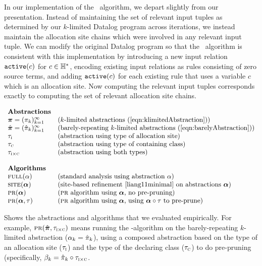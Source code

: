 In our implementation of the \PR\ algorithm, we depart slightly from our
presentation.  Instead of maintaining the set of relevant input tuples as
determined by our $k$-limited Datalog program across iterations, we instead
maintain the allocation site chains which were involved in any relevant input
tuple.  We can modify the original Datalog program so that the \PR\ algorithm
is consistent with this implementation by introducing a new input relation
$\text{\tt active}(c)$ for $c \in {\mathbb H}^*$, encoding existing input relations as rules
consisting of zero source terms, and adding $\text{\tt active}(c)$ for each existing
rule that uses a variable $c$ which is an allocation site.  Now computing the
relevant input tuples corresponds exactly to computing the set of relevant
allocation site chains.

\begin{table}
\[
\begin{array}{ll}
\text{\bf Abstractions} \\
\Klimabs = (\klimabs_k)_{k=1}^\infty   & \defn{$k$-limited abstractions \refeqn{klimitedAbstraction}} \\
\Klimdabs = (\klimdabs_k)_{k=1}^\infty & \defn{barely-repeating $k$-limited abstractions \refeqn{barelyAbstraction}} \\
\hclassIs                              & \defn{abstraction using type of allocation site} \\
\hclassHas                             & \defn{abstraction using type of containing class} \\
\hclassIsHas                           & \defn{abstraction using both types} \\
\\
\text{\bf Algorithms} \\
\Full(\alpha)         & \defn{standard analysis using abstraction $\alpha$} \\
\Site(\balpha)        & \defn{site-based refinement \cite{liang11minimal} on abstractions $\balpha$} \\
\PR(\balpha)          & \defn{\PR\ algorithm using $\balpha$, no pre-pruning} \\
\PR(\balpha,\hclass)  & \defn{\PR\ algorithm using $\balpha$, using $\balpha\circ\hclass$ to pre-prune} \\
\end{array}
\]
\caption{\label{tab:algorithms} Shows the abstractions and algorithms that we evaluated empirically.
For example,
$\text{\sc pr}(\hat{\mbox{\boldmath$\pi$}},\tau_{\text{\sc i} \times \text{\sc c}})$
means running the \PR-algorithm on the barely-repeating $k$-limited abstraction ($\alpha_k = \hat{\pi}_k$),
using a composed abstraction based on the type of an allocation site ($\tau_{\text{\sc i}}$) 
and the type of the declaring class ($\tau_{\text{\sc c}}$) to do pre-pruning
(specifically, $\beta_k = \hat{\pi}_k \circ \tau_{\text{\sc i} \times \text{\sc c}}$.
}
\end{table}

